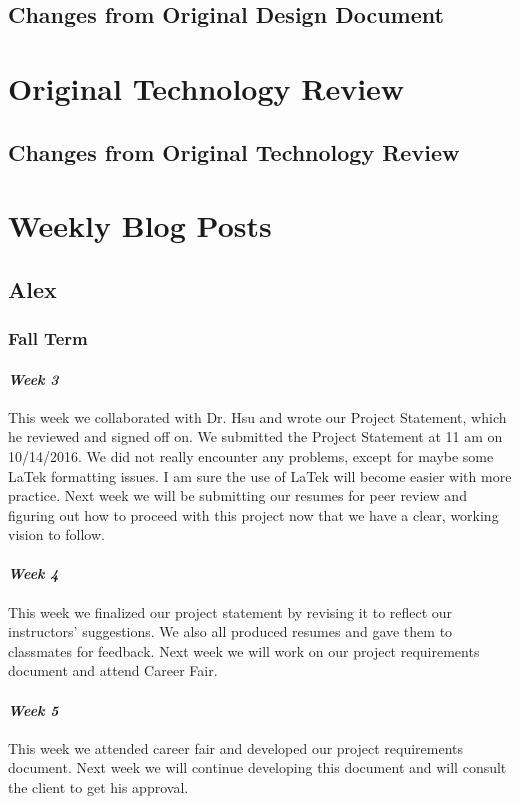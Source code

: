 \documentclass[onecolumn, draftclsnofoot,10pt, compsoc]{IEEEtran}
\begin{document}
\subsection{Changes from Original Design Document}

\section{Original Technology Review}


\subsection{Changes from Original Technology Review}

\section{Weekly Blog Posts}
\subsection{Alex}
\subsubsection{Fall Term}
\paragraph{\emph{Week 3}}
This week we collaborated with Dr. Hsu and wrote our Project Statement, which he reviewed and signed off on. We submitted the Project Statement at 11 am on 10/14/2016. We did not really encounter any problems, except for maybe some LaTek formatting issues. I am sure the use of LaTek will become easier with more practice. Next week we will be submitting our resumes for peer review and figuring out how to proceed with this project now that we have a clear, working vision to follow.
\paragraph{\emph{Week 4}}
This week we finalized our project statement by revising it to reflect our instructors' suggestions. We also all produced resumes and gave them to classmates for feedback. Next week we will work on our project requirements document and attend Career Fair.
\paragraph{\emph{Week 5}}
This week we attended career fair and developed our project requirements document. Next week we will continue developing this document and will consult the client to get his approval.
\end{document}
